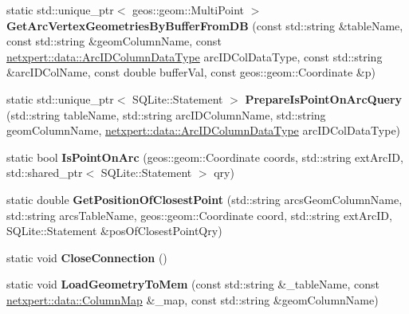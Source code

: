 \begin{DoxyCompactItemize}
\item 
static std\+::unique\+\_\+ptr$<$ geos\+::geom\+::\+Multi\+Point $>$ {\bfseries Get\+Arc\+Vertex\+Geometries\+By\+Buffer\+From\+DB} (const std\+::string \&table\+Name, const std\+::string \&geom\+Column\+Name, const \hyperlink{namespacenetxpert_1_1data_a7f0e5c814a8a55ea94f348b10826e206}{netxpert\+::data\+::\+Arc\+I\+D\+Column\+Data\+Type} arc\+I\+D\+Col\+Data\+Type, const std\+::string \&arc\+I\+D\+Col\+Name, const double buffer\+Val, const geos\+::geom\+::\+Coordinate \&p)\hypertarget{classnetxpert_1_1io_1_1DBHELPER_af5fea985543faa266073b9584c9c2993}{}\label{classnetxpert_1_1io_1_1DBHELPER_af5fea985543faa266073b9584c9c2993}

\item 
static std\+::unique\+\_\+ptr$<$ S\+Q\+Lite\+::\+Statement $>$ {\bfseries Prepare\+Is\+Point\+On\+Arc\+Query} (std\+::string table\+Name, std\+::string arc\+I\+D\+Column\+Name, std\+::string geom\+Column\+Name, \hyperlink{namespacenetxpert_1_1data_a7f0e5c814a8a55ea94f348b10826e206}{netxpert\+::data\+::\+Arc\+I\+D\+Column\+Data\+Type} arc\+I\+D\+Col\+Data\+Type)\hypertarget{classnetxpert_1_1io_1_1DBHELPER_a9d49d1a45cc7317b42426f7b49f59ff0}{}\label{classnetxpert_1_1io_1_1DBHELPER_a9d49d1a45cc7317b42426f7b49f59ff0}

\item 
static bool {\bfseries Is\+Point\+On\+Arc} (geos\+::geom\+::\+Coordinate coords, std\+::string ext\+Arc\+ID, std\+::shared\+\_\+ptr$<$ S\+Q\+Lite\+::\+Statement $>$ qry)\hypertarget{classnetxpert_1_1io_1_1DBHELPER_ae71296535a5fd34865b8b53e9db35180}{}\label{classnetxpert_1_1io_1_1DBHELPER_ae71296535a5fd34865b8b53e9db35180}

\item 
static double {\bfseries Get\+Position\+Of\+Closest\+Point} (std\+::string arcs\+Geom\+Column\+Name, std\+::string arcs\+Table\+Name, geos\+::geom\+::\+Coordinate coord, std\+::string ext\+Arc\+ID, S\+Q\+Lite\+::\+Statement \&pos\+Of\+Closest\+Point\+Qry)\hypertarget{classnetxpert_1_1io_1_1DBHELPER_aef956790dbe373a5c140e923493e5cd2}{}\label{classnetxpert_1_1io_1_1DBHELPER_aef956790dbe373a5c140e923493e5cd2}

\item 
static void {\bfseries Close\+Connection} ()\hypertarget{classnetxpert_1_1io_1_1DBHELPER_a77b192e35cfe5a7291859622583f906b}{}\label{classnetxpert_1_1io_1_1DBHELPER_a77b192e35cfe5a7291859622583f906b}

\item 
static void {\bfseries Load\+Geometry\+To\+Mem} (const std\+::string \&\+\_\+table\+Name, const \hyperlink{structnetxpert_1_1data_1_1ColumnMap}{netxpert\+::data\+::\+Column\+Map} \&\+\_\+map, const std\+::string \&geom\+Column\+Name)\hypertarget{classnetxpert_1_1io_1_1DBHELPER_a45895a557a20d42912aba39db006de59}{}\label{classnetxpert_1_1io_1_1DBHELPER_a45895a557a20d42912aba39db006de59}


\end{DoxyCompactItemize}
